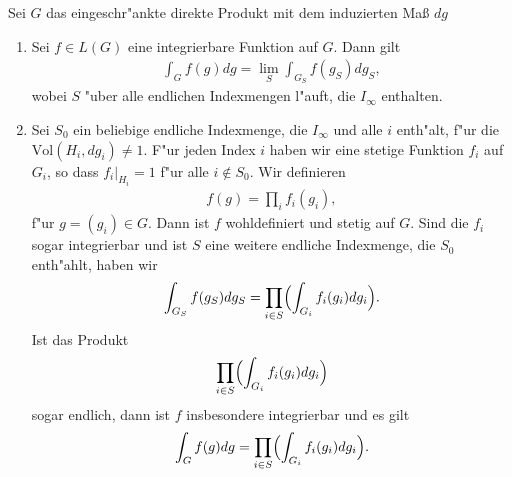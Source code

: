 		\begin{proposition}\label{prop:integrieren}
			Sei $G$ das eingeschr"ankte direkte Produkt mit dem induzierten Maß $dg$
			\begin{enumerate}[label=(\roman*)]
				\item Sei $f \in L(G)$ eine integrierbare Funktion auf $G$. Dann gilt
					\begin{align*}
						\int_G f(g)dg = \lim_S \int_{G_S} f(g_S) dg_S,
					\end{align*}
					wobei $S$ "uber alle endlichen Indexmengen l"auft, die $I_\infty$ enthalten.
				\item Sei $S_0$ ein beliebige endliche Indexmenge, die $I_\infty$ und alle $i$ enth"alt, f"ur die $\text{Vol}(H_i, dg_i) \not= 1$. 
					F"ur jeden Index $i$ haben wir eine stetige Funktion $f_i$ auf $G_i$, so dass $f_i |_{H_i} = 1$ f"ur alle $i \notin S_0$. 
					Wir definieren
					\begin{align*}
						f(g) = \prod_{i}f_{i}(g_i),
					\end{align*}
					f"ur $g=(g_i) \in G$. 
					Dann ist $f$ wohldefiniert und stetig auf $G$. 
					Sind die $f_i$ sogar integrierbar und ist $S$ eine weitere endliche Indexmenge, die $S_0$ enth"ahlt, haben wir
					\begin{align}\label{eq:satz:integration}
						\int_{G_S} f(g_S) dg_S = \prod_{i \in S}\Bigl(\int_{G_i} f_i (g_i)dg_i\Bigr).
					\end{align}
					Ist das Produkt
					\begin{align*}
						\prod_{i \in S}\Bigl(\int_{G_i} f_i (g_i)dg_i\Bigr)
					\end{align*}
					sogar endlich, dann ist $f$ insbesondere integrierbar und es gilt
					\begin{align*}
						\int_{G} f(g) dg = \prod_{i \in S}\Bigl(\int_{G_i} f_i (g_i)dg_i\Bigr).
					\end{align*}	
			\end{enumerate}
		\end{proposition}
		

